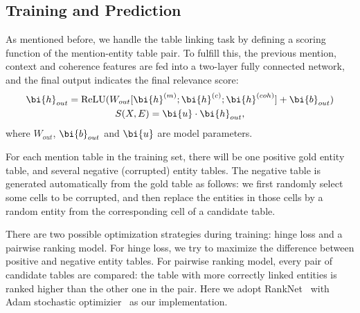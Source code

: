 \subsection{Training and Prediction}
\label{sec:strategy}

As mentioned before, we handle the table linking task by defining a 
scoring function of the mention-entity table pair.
To fulfill this,
the previous mention, context and coherence features are fed
into a two-layer fully connected network,
and the final output indicates the final relevance score:
\begin{equation}
  \label{eqn:score}
  \begin{gathered}
    \bi{h}_{out}  = \mbox{ReLU}(W_{out}[\bi{h}^{(m)}; \bi{h}^{(c)}; \bi{h}^{(coh)}] + \bi{b}_{out}) \\
    S(X, E)         = \bi{u} \cdot \bi{h}_{out},
  \end{gathered}
\end{equation}
\noindent
where $W_{out}$, $\bi{b}_{out}$ and $\bi{u}$ are model parameters.

For each mention table in the training set,
there will be one positive gold entity table,
and several negative (corrupted) entity tables.
The negative table is generated automatically from the gold table as follows:
we first randomly select some cells to be corrupted, 
and then replace the entities in those cells by a random entity from
the corresponding cell of a candidate table.

There are two possible optimization strategies during training: hinge loss
and a pairwise ranking model. For hinge loss, we try to maximize the difference
between positive and negative entity tables. For pairwise ranking model,
every pair of candidate tables are compared: the table with more
correctly linked entities is ranked higher than the other one in the pair.
Here we adopt RankNet~\cite{burges2010ranknet} with Adam stochastic 
optimizier~\cite{kingma2014adam} as our implementation.


